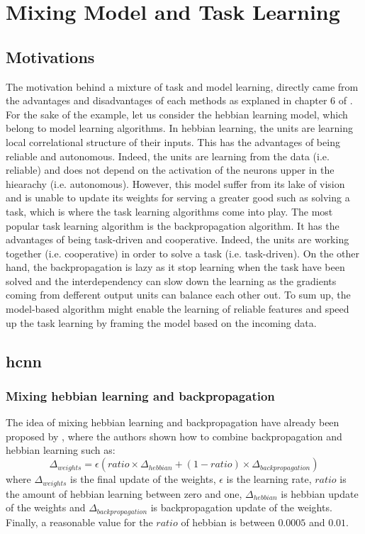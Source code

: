 \documentclass[11pt]{report}
\begin{document}
\chapter{Mixing Model and Task Learning} \label{model_and_task_learning}

\section{Motivations}

The motivation behind a mixture of task and model learning, directly came from the advantages and disadvantages of each methods as explaned in chapter 6 of \textcite{OReilly:2000:CEC:557205}. For the sake of the example, let us consider the hebbian learning model, which belong to model learning algorithms. In hebbian learning, the units are learning local correlational structure of their inputs. This has the advantages of being reliable and autonomous. Indeed, the units are learning from the data (i.e. reliable) and does not depend on the activation of the neurons upper in the hiearachy (i.e. autonomous). However, this model suffer from its lake of vision and is unable to update its weights for serving a greater good such as solving a task, which is where the task learning algorithms come into play. The most popular task learning algorithm is the backpropagation algorithm. It has the advantages of being task-driven and cooperative. Indeed, the units are working together (i.e. cooperative) in order to solve a task (i.e. task-driven). On the other hand, the backpropagation is lazy as it stop learning when the task have been solved and the interdependency can slow down the learning as the gradients coming from defferent output units can balance each other out. To sum up, the model-based algorithm might enable the learning of reliable features and speed up the task learning by framing the model based on the incoming data.

\section{\acrlong{hcnn}}

\subsection{Mixing hebbian learning and backpropagation} \label{sec:mix_hebb_bp}

The idea of mixing hebbian learning and backpropagation have already been proposed by \textcite{OReilly:2000:CEC:557205}, where the authors shown how to combine backpropagation and hebbian learning such as:
\begin{equation}
\Delta_{weights} = \epsilon (ratio \times \Delta_{hebbian} + (1 - ratio) \times \Delta_{backpropagation})
\end{equation}
where $\Delta_{weights}$ is the final update of the weights, $\epsilon$ is the learning rate, $ratio$ is the amount of hebbian learning between zero and one, $\Delta_{hebbian}$ is hebbian update of the weights and $\Delta_{backpropagation}$ is backpropagation update of the weights. Finally, a reasonable value for the $ratio$ of hebbian is between $0.0005$ and $0.01$.
\end{document}
